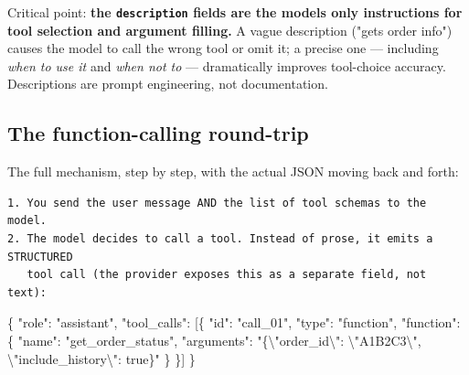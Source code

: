 \documentclass[11pt]{article}
\newenvironment{Shaded}{\begin{snugshade}}{\end{snugshade}}
\newcommand{\CharTok}[1]{\textcolor[rgb]{0.24,0.68,0.91}{#1}}
\newcommand{\DataTypeTok}[1]{\textcolor[rgb]{0.16,0.50,0.73}{#1}}
\newcommand{\FunctionTok}[1]{\textcolor[rgb]{0.56,0.27,0.68}{#1}}
\newcommand{\OtherTok}[1]{\textcolor[rgb]{0.15,0.68,0.38}{#1}}
\newcommand{\StringTok}[1]{\textcolor[rgb]{0.96,0.31,0.31}{#1}}
\begin{document}
Critical point: \textbf{the \texttt{description} fields are the model\textquotesingle s only instructions for tool selection and argument filling.} A vague description ("gets order info") causes the model to call the wrong tool or omit it; a precise one --- including \emph{when to use it} and \emph{when not to} --- dramatically improves tool-choice accuracy. Descriptions are prompt engineering, not documentation.

\subsection{The function-calling round-trip}\label{the-function-calling-round-trip}

The full mechanism, step by step, with the actual JSON moving back and forth:

\setcodelang{}

\begin{verbatim}
1. You send the user message AND the list of tool schemas to the model.
2. The model decides to call a tool. Instead of prose, it emits a STRUCTURED
   tool call (the provider exposes this as a separate field, not text):
\end{verbatim}


\begin{Shaded}
\begin{Highlighting}[]
\FunctionTok{\{}
  \DataTypeTok{"role"}\FunctionTok{:} \StringTok{"assistant"}\FunctionTok{,}
  \DataTypeTok{"tool\_calls"}\FunctionTok{:} \OtherTok{[}\FunctionTok{\{}
    \DataTypeTok{"id"}\FunctionTok{:} \StringTok{"call\_01"}\FunctionTok{,}
    \DataTypeTok{"type"}\FunctionTok{:} \StringTok{"function"}\FunctionTok{,}
    \DataTypeTok{"function"}\FunctionTok{:} \FunctionTok{\{}
      \DataTypeTok{"name"}\FunctionTok{:} \StringTok{"get\_order\_status"}\FunctionTok{,}
      \DataTypeTok{"arguments"}\FunctionTok{:} \StringTok{"\{}\CharTok{\textbackslash{}"}\StringTok{order\_id}\CharTok{\textbackslash{}"}\StringTok{: }\CharTok{\textbackslash{}"}\StringTok{A1B2C3}\CharTok{\textbackslash{}"}\StringTok{, }\CharTok{\textbackslash{}"}\StringTok{include\_history}\CharTok{\textbackslash{}"}\StringTok{: true\}"}
    \FunctionTok{\}}
  \FunctionTok{\}}\OtherTok{]}
\FunctionTok{\}}
\end{Highlighting}
\end{Shaded}

\end{document}
